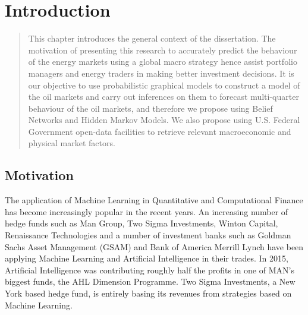 \chapter{Introduction}

\begin{quote}
This chapter introduces the general context of the dissertation. The motivation of presenting this research to accurately predict the behaviour of the energy markets using a global macro strategy hence assist portfolio managers and energy traders in making better investment decisions. It is our objective to use probabilistic graphical models to construct a model of the oil markets and carry out inferences on them to forecast multi-quarter behaviour of the oil markets, and therefore we propose using Belief Networks and Hidden Markov Models. We also propose using U.S. Federal Government open-data facilities to retrieve relevant macroeconomic and physical market factors.
\end{quote}

\section{Motivation}

The application of Machine Learning in Quantitative and Computational Finance has become increasingly popular in the recent years. An increasing number of hedge funds such as Man Group, Two Sigma Investments, Winton Capital, Renaissance Technologies and a number of investment banks such as Goldman Sachs Asset Management (GSAM) and Bank of America Merrill Lynch have been applying Machine Learning and Artificial Intelligence in their trades. In 2015, Artificial Intelligence was contributing roughly half the profits in one of MAN’s biggest funds, the AHL Dimension Programme. Two Sigma Investments, a New York based hedge fund, is entirely basing its revenues from strategies based on Machine Learning.  \\

